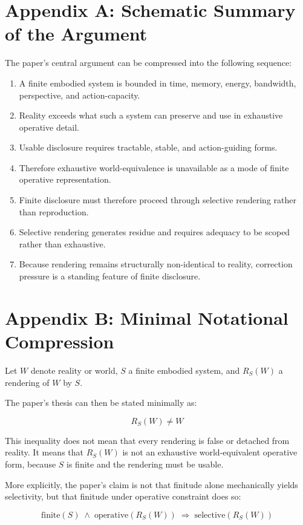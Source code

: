 \documentclass[11pt]{article}
\begin{document}
\appendix
\section{Appendix A: Schematic Summary of the Argument}

The paper's central argument can be compressed into the following sequence:

\begin{enumerate}
    \item A finite embodied system is bounded in time, memory, energy, bandwidth, perspective, and action-capacity.
    \item Reality exceeds what such a system can preserve and use in exhaustive operative detail.
    \item Usable disclosure requires tractable, stable, and action-guiding forms.
    \item Therefore exhaustive world-equivalence is unavailable as a mode of finite operative representation.
    \item Finite disclosure must therefore proceed through selective rendering rather than reproduction.
    \item Selective rendering generates residue and requires adequacy to be scoped rather than exhaustive.
    \item Because rendering remains structurally non-identical to reality, correction pressure is a standing feature of finite disclosure.
\end{enumerate}

\section{Appendix B: Minimal Notational Compression}

Let \(W\) denote reality or world, \(S\) a finite embodied system, and \(R_S(W)\) a rendering of \(W\) by \(S\).

The paper's thesis can then be stated minimally as:

\[
R_S(W) \neq W
\]

This inequality does not mean that every rendering is false or detached from reality. It means that \(R_S(W)\) is not an exhaustive world-equivalent operative form, because \(S\) is finite and the rendering must be usable.

More explicitly, the paper's claim is not that finitude alone mechanically yields selectivity, but that finitude under operative constraint does so:

\[
\text{finite}(S) \;\land\; \text{operative}(R_S(W)) \;\Rightarrow\; \text{selective}(R_S(W))
\]
\end{document}
